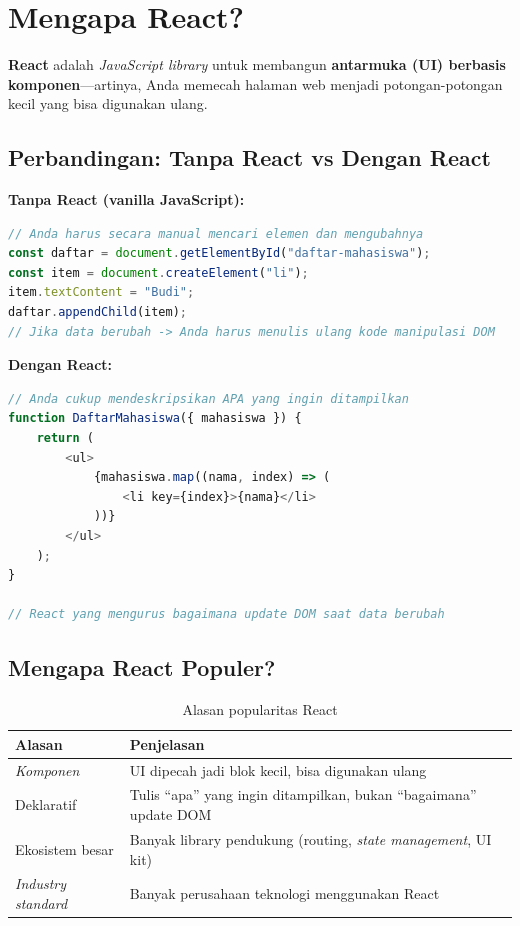 \section{Mengapa React?}
\label{sec:13-mengapa-react}

\textbf{React} adalah \emph{JavaScript library} untuk membangun \textbf{antarmuka (UI) berbasis komponen}---artinya, Anda memecah halaman web menjadi potongan-potongan kecil yang bisa digunakan ulang.

\subsection{Perbandingan: Tanpa React vs Dengan React}

\textbf{Tanpa React (vanilla JavaScript):}

\begin{lstlisting}[language=JavaScript, caption={Manipulasi DOM manual tanpa React}, label={lst:13-vanilla}]
// Anda harus secara manual mencari elemen dan mengubahnya
const daftar = document.getElementById("daftar-mahasiswa");
const item = document.createElement("li");
item.textContent = "Budi";
daftar.appendChild(item);
// Jika data berubah -> Anda harus menulis ulang kode manipulasi DOM
\end{lstlisting}

\textbf{Dengan React:}

\begin{lstlisting}[language=JavaScript, caption={Menulis UI secara deklaratif dengan React}, label={lst:13-react-basic}]
// Anda cukup mendeskripsikan APA yang ingin ditampilkan
function DaftarMahasiswa({ mahasiswa }) {
    return (
        <ul>
            {mahasiswa.map((nama, index) => (
                <li key={index}>{nama}</li>
            ))}
        </ul>
    );
}

// React yang mengurus bagaimana update DOM saat data berubah
\end{lstlisting}

\subsection{Mengapa React Populer?}

\begin{table}[htbp]
\centering
\caption{Alasan popularitas React}
\label{tab:13-mengapa-react}
\begin{tabular}{ll}
\toprule
\textbf{Alasan} & \textbf{Penjelasan} \\
\midrule
\emph{Komponen} & UI dipecah jadi blok kecil, bisa digunakan ulang \\
Deklaratif & Tulis ``apa'' yang ingin ditampilkan, bukan ``bagaimana'' update DOM \\
Ekosistem besar & Banyak library pendukung (routing, \emph{state management}, UI kit) \\
\emph{Industry standard} & Banyak perusahaan teknologi menggunakan React \\
\bottomrule
\end{tabular}
\end{table}

